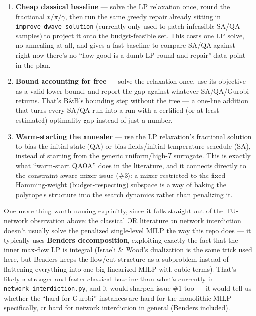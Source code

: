 \documentclass[11pt]{article}
\newcommand{\code}[1]{\texttt{#1}}
\begin{document}
\begin{enumerate}[leftmargin=1.5em]
\item \textbf{Cheap classical baseline} --- solve the LP relaxation once, round the fractional $x/\pi/\gamma$, then run the same greedy repair already sitting in \code{improve\_dwave\_solution} (currently only used to patch infeasible SA/QA samples) to project it onto the budget-feasible set. This costs one LP solve, no annealing at all, and gives a fast baseline to compare SA/QA against --- right now there's no ``how good is a dumb LP-round-and-repair'' data point in the plan.

\item \textbf{Bound accounting for free} --- solve the relaxation once, use its objective as a valid lower bound, and report the gap against whatever SA/QA/Gurobi returns. That's B\&B's bounding step without the tree --- a one-line addition that turns every SA/QA run into a run with a certified (or at least estimated) optimality gap instead of just a number.

\item \textbf{Warm-starting the annealer} --- use the LP relaxation's fractional solution to bias the initial state (QA) or bias fields/initial temperature schedule (SA), instead of starting from the generic uniform/high-$T$ surrogate. This is exactly what ``warm-start QAOA'' does in the literature, and it connects directly to the constraint-aware mixer issue (\#3): a mixer restricted to the fixed-Hamming-weight (budget-respecting) subspace is a way of baking the polytope's structure into the search dynamics rather than penalizing it.
\end{enumerate}

One more thing worth naming explicitly, since it falls straight out of the TU-network observation above: the classical OR literature on network interdiction doesn't usually solve the penalized single-level MILP the way this repo does --- it typically uses \textbf{Benders decomposition}, exploiting exactly the fact that the inner max-flow LP is integral (Israeli \& Wood's dualization is the same trick used here, but Benders keeps the flow/cut structure as a subproblem instead of flattening everything into one big linearized MILP with cubic terms). That's likely a stronger and faster classical baseline than what's currently in \code{network\_interdiction.py}, and it would sharpen issue \#1 too --- it would tell us whether the ``hard for Gurobi'' instances are hard for the monolithic MILP specifically, or hard for network interdiction in general (Benders included).
\end{document}
